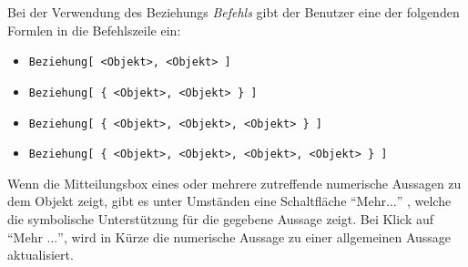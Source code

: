 \documentclass{article}
\begin{document}
Bei der Verwendung des Beziehungs \textit{Befehls} gibt der Benutzer eine der folgenden Formlen in die Befehlszeile ein:
\begin{itemize}
    \item \texttt{Beziehung[ <Objekt>, <Objekt> ]}
    \item \texttt{Beziehung[ \{ <Objekt>, <Objekt> \} ]}
    \item \texttt{Beziehung[ \{ <Objekt>, <Objekt>, <Objekt> \} ]}
    \item \texttt{Beziehung[ \{ <Objekt>, <Objekt>, <Objekt>, <Objekt> \} ]}
\end{itemize}

Wenn die Mitteilungsbox eines oder mehrere zutreffende numerische Aussagen zu dem Objekt zeigt, gibt es unter Umständen eine Schaltfläche  ``Mehr$\ldots$'' , welche die symbolische Unterstützung für die gegebene Aussage zeigt. Bei Klick auf ``Mehr $\ldots$'', wird in Kürze die numerische Aussage zu einer allgemeinen Aussage aktualisiert.
\end{document}
